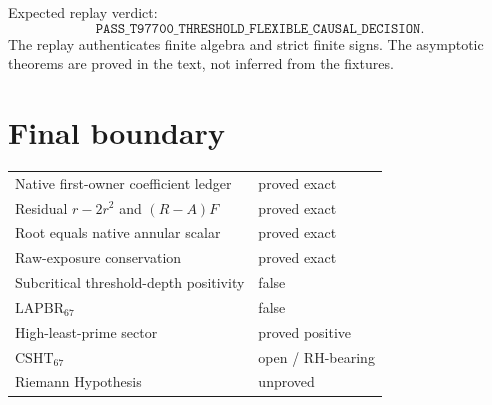 \documentclass[11pt]{article}
\newcommand{\CSHT}{\mathrm{CSHT}_{67}}
\newcommand{\LAPBR}{\mathrm{LAPBR}_{67}}
\begin{document}
Expected replay verdict:
\[
\texttt{PASS\_T97700\_THRESHOLD\_FLEXIBLE\_CAUSAL\_DECISION}.
\]
The replay authenticates finite algebra and strict finite signs.  The
asymptotic theorems are proved in the text, not inferred from the fixtures.

\section{Final boundary}

\begin{center}
\begin{tabular}{ll}
\toprule
Native first-owner coefficient ledger & proved exact\\
Residual $r-2r^2$ and $(R-A)F$ & proved exact\\
Root equals native annular scalar & proved exact\\
Raw-exposure conservation & proved exact\\
Subcritical threshold-depth positivity & false\\
$\LAPBR$ & false\\
High-least-prime sector & proved positive\\
$\CSHT$ & open / RH-bearing\\
Riemann Hypothesis & unproved\\
\bottomrule
\end{tabular}
\end{center}
\end{document}
